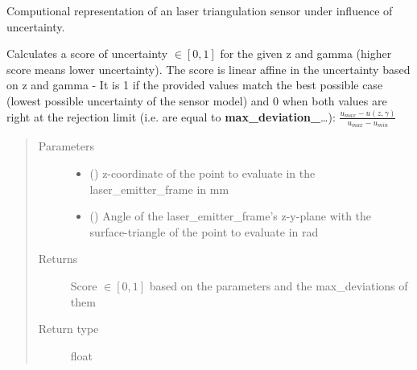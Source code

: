 \documentclass[letterpaper,10pt,english]{sphinxmanual}
\begin{document}
\begin{fulllineitems}
\label{\detokenize{module_sensor_model:agiprobot_measurement.sensor_model.SensorModel}}
Computional representation of an laser triangulation sensor under influence of uncertainty.

\begin{fulllineitems}
\label{\detokenize{module_sensor_model:agiprobot_measurement.sensor_model.SensorModel.evaluate_score}}
Calculates a score of uncertainty \(\in [0,1]\) for the given z and gamma (higher score means lower uncertainty). The score
is linear affine in the uncertainty based on z and gamma - It is 1 if the provided values match the best possible case (lowest
possible uncertainty of the sensor model) and 0 when both values are right at the rejection limit (i.e. are equal to {\color{red}\bfseries{}max\_deviation\_}…):
\(\frac{u_{max} - u(z, \gamma)}{u_{max} - u_{min}}\)
\begin{quote}\begin{description}
\item[{Parameters}] \leavevmode\begin{itemize}
\item {} 
 () \textendash{} z-coordinate of the point to evaluate in the laser\_emitter\_frame in mm

\item {} 
 () \textendash{} Angle of the laser\_emitter\_frame’s z-y-plane with the surface-triangle of the point to evaluate in rad

\end{itemize}

\item[{Returns}] \leavevmode
Score \(\in [0,1]\) based on the parameters and the max\_deviations of them

\item[{Return type}] \leavevmode
float

\end{description}\end{quote}

\end{fulllineitems}


\end{fulllineitems}
\end{document}
